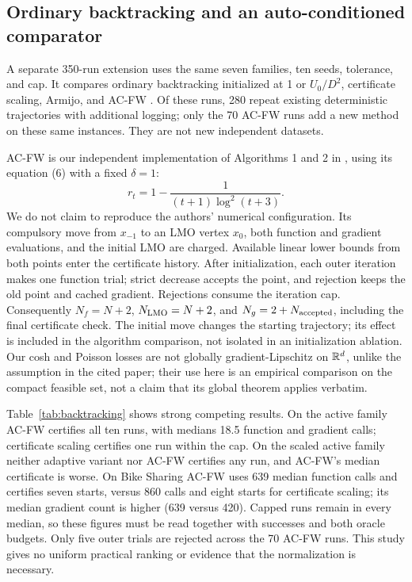 \subsection{Ordinary backtracking and an auto-conditioned comparator}
A separate 350-run extension uses the same seven families, ten seeds,
tolerance, and cap. It compares ordinary backtracking initialized at 1
or $U_0/D^2$, certificate scaling, Armijo, and AC-FW
\cite{autoconditioned}. Of these runs, 280 repeat existing deterministic
trajectories with additional logging; only the 70 AC-FW runs add a new
method on these same instances. They are not new independent datasets.

AC-FW is our independent implementation of Algorithms 1 and 2 in
\cite{autoconditioned}, using its equation (6) with a fixed $\delta=1$:
\[
 r_t=1-\frac{1}{(t+1)\log^2(t+3)}.
\]
We do not claim to reproduce the authors' numerical configuration.
Its compulsory move from $x_{-1}$ to an LMO vertex $x_0$, both function
and gradient evaluations, and the initial LMO are charged. Available
linear lower bounds from both points enter the certificate history.
After initialization, each outer iteration makes one function trial;
strict decrease accepts the point, and rejection keeps the old point
and cached gradient. Rejections consume the iteration cap. Consequently
$N_f=N+2$, $N_{\rm LMO}=N+2$, and $N_g=2+N_{\rm accepted}$, including the
final certificate check. The initial move changes the starting trajectory;
its effect is included in the algorithm comparison, not isolated in an
initialization ablation. Our cosh and Poisson losses are not globally
gradient-Lipschitz on $\mathbb R^d$, unlike the assumption in the cited paper;
their use here is an empirical comparison on the compact feasible set,
not a claim that its global theorem applies verbatim.

Table~\ref{tab:backtracking} shows strong competing results. On the active
family AC-FW certifies all ten runs, with medians 18.5 function and gradient
calls; certificate scaling certifies one run within the cap. On the scaled
active family neither adaptive variant nor AC-FW certifies any run, and
AC-FW's median certificate is worse. On Bike Sharing AC-FW uses 639 median
function calls and certifies seven starts, versus 860 calls and eight
starts for certificate scaling; its median gradient count is higher
(639 versus 420). Capped runs remain in every median, so these figures
must be read together with successes and both oracle budgets. Only five
outer trials are rejected across the 70 AC-FW runs. This study gives no
uniform practical ranking or evidence that the normalization is necessary.

